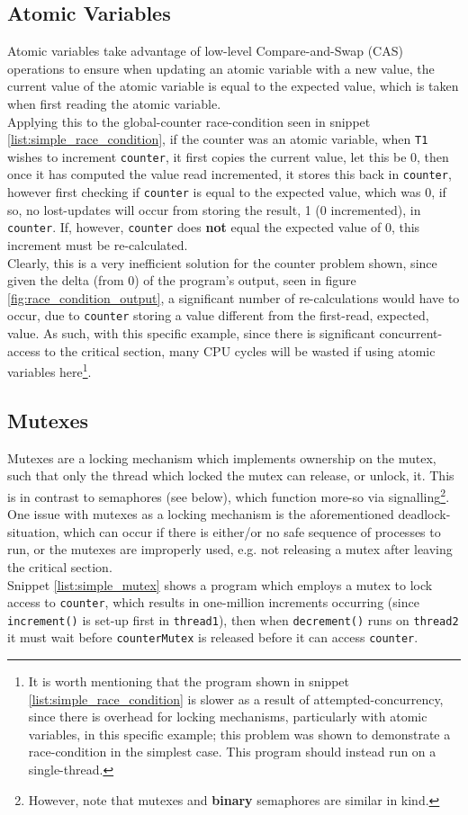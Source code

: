 \subsection{Atomic Variables}
Atomic variables take advantage of low-level Compare-and-Swap (CAS) operations to ensure when updating an atomic variable with a new value, the current value of the atomic variable is equal to the expected value, which is taken when first reading the atomic variable.\\
Applying this to the global-counter race-condition seen in snippet \ref{list:simple_race_condition}, if the counter was an atomic variable, when \texttt{T1} wishes to increment \texttt{counter}, it first copies the current value, let this be 0, then once it has computed the value read incremented, it stores this back in \texttt{counter}, however first checking if \texttt{counter} is equal to the expected value, which was 0, if so, no lost-updates will occur from storing the result, 1 (0 incremented), in \texttt{counter}. If, however, \texttt{counter} does \textbf{not} equal the expected value of 0, this increment must be re-calculated.\\
Clearly, this is a very inefficient solution for the counter problem shown, since given the delta (from 0) of the program's output, seen in figure \ref{fig:race_condition_output}, a significant number of re-calculations would have to occur, due to \texttt{counter} storing a value different from the first-read, expected, value. As such, with this specific example, since there is significant concurrent-access to the critical section, many CPU cycles will be wasted if using atomic variables here\footnote{It is worth mentioning that the program shown in snippet \ref{list:simple_race_condition} is slower as a result of attempted-concurrency, since there is overhead for locking mechanisms, particularly with atomic variables, in this specific example; this problem was shown to demonstrate a race-condition in the simplest case. This program should instead run on a single-thread.}.

\subsection{Mutexes}
Mutexes are a locking mechanism which implements ownership on the mutex, such that only the thread which locked the mutex can release, or unlock, it. This is in contrast to semaphores (see below), which function more-so via signalling\footnote{However, note that mutexes and \textbf{binary} semaphores are similar in kind.}.\\
One issue with mutexes as a locking mechanism is the aforementioned deadlock-situation, which can occur if there is either/or no safe sequence of processes to run, or the mutexes are improperly used, e.g. not releasing a mutex after leaving the critical section.\\
Snippet \ref{list:simple_mutex} shows a program which employs a mutex to lock access to \texttt{counter}, which results in one-million increments occurring (since \texttt{increment()} is set-up first in \texttt{thread1}), then when \texttt{decrement()} runs on \texttt{thread2} it must wait before \texttt{counterMutex} is released before it can access \texttt{counter}.

